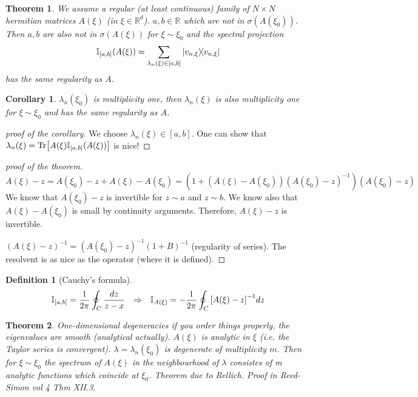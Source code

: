 \documentclass{article}
\newtheorem*{theorem}{Theorem}
\newtheorem*{definition}{Definition}
\newtheorem*{corollary}{Corollary}
\newcommand{\RR}{\mathbb{R}}
\newcommand{\II}{\mathbb{I}}
\newcommand{\sig}{\sigma}
\newcommand{\la}{\lambda}
\begin{document}
\begin{theorem}
    We assume a regular (at least continuous) family of $N \times N$ hermitian matrices $A(\xi)$ (in $\xi \in \RR^d$). 
    $a,b \in \RR$ which are not in $\sig(A(\xi_0))$.
    Then $a,b$ are also not in $\sig(A(\xi))$ for $\xi \sim \xi_0$ and the spectral projection
    $$\II_{[a,b]}(A(\xi))  = \sum_{\la_n(\xi) \in [a,b]} \dyad{v_{n,\xi}}$$ 
    has the same regularity as $A$.
\end{theorem}
\begin{corollary}
  $\la_n(\xi_0)$ is multiplicity one, then $\la_n(\xi)$ is also multiplicity one for $\xi \sim \xi_0$ and has the same regularity as $A$.
\end{corollary}

\begin{proof}[proof of the corollary] 
  We choose $\la_n(\xi) \in [a,b]$.
  One can show that $\la_n(\xi) = \Tr[A(\xi)\II_{[a,b]}(A(\xi))]$ is nice!
\end{proof}  

\begin{proof}[proof of the theorem] 
    $A(\xi) - z = A(\xi_0) - z + A(\xi) - A(\xi_0) = (1 + (A(\xi) - A(\xi_0)) (A(\xi_0) - z)^{-1}) (A(\xi_0) - z)$
    We know that $A(\xi_0) - z$ is invertible for $z \sim a$ and $z \sim b$.
    We know also that $A(\xi) - A(\xi_0)$ is small by continuity arguments.
    Therefore, $A(\xi) - z$ is invertible.
    
    $(A(\xi) - z)^{-1} = (A(\xi_0) - z)^{-1} (1 + B)^{-1}$ (regularity of series).
    The resolvent is as nice as the operator (where it is defined).
\end{proof}  
 
\begin{definition}[Cauchy's formula] 
  $$\II_{[a,b]} = \frac{1}{2\pi} \oint_{C} \frac{dz}{z-x}
  \qq{$\Rightarrow$}  \II_{A(\xi)} = - \frac{1}{2\pi} \oint_{C} \qty[A(\xi) - z]^{-1} dz$$
\end{definition}

\begin{theorem}{One-dimensional degeneracies}
    if you order things properly, the eigenvalues are smooth (analytical actually).
    $A(\xi)$ is analytic in $\xi$ (i.e. the Taylor series is convergent).
    $\la = \la_n(\xi_0)$ is degenerate of multiplicity $m$.
    Then for $\xi \sim \xi_0$ the spectrum of $A(\xi)$ in the neighbourhood of $\la$ consistes of m analytic functions which coincide at $\xi_0$.
    Theorem due to Rellich. Proof in Reed-Simon vol 4 Thm XII.3.
\end{theorem}
\end{document}
